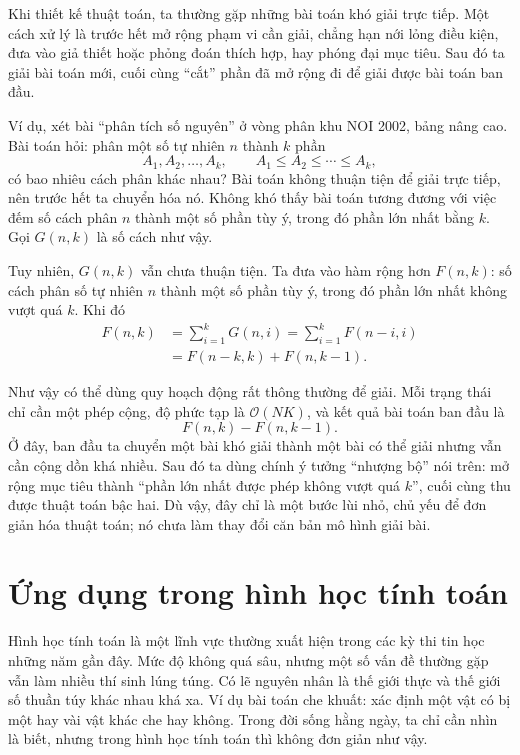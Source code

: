\documentclass[11pt]{article}
\newcommand{\Oh}{\mathcal{O}}
\begin{document}
Khi thiết kế thuật toán, ta thường gặp những bài toán khó giải trực tiếp. Một
cách xử lý là trước hết mở rộng phạm vi cần giải, chẳng hạn nới lỏng điều
kiện, đưa vào giả thiết hoặc phỏng đoán thích hợp, hay phóng đại mục tiêu.
Sau đó ta giải bài toán mới, cuối cùng ``cắt'' phần đã mở rộng đi để giải được
bài toán ban đầu.

Ví dụ, xét bài ``phân tích số nguyên'' ở vòng phân khu NOI 2002, bảng nâng
cao. Bài toán hỏi: phân một số tự nhiên $n$ thành $k$ phần
\[
  A_1,A_2,\ldots,A_k,\qquad A_1\le A_2\le\cdots\le A_k,
\]
có bao nhiêu cách phân khác nhau? Bài toán không thuận tiện để giải trực tiếp,
nên trước hết ta chuyển hóa nó. Không khó thấy bài toán tương đương với việc
đếm số cách phân $n$ thành một số phần tùy ý, trong đó phần lớn nhất bằng
$k$. Gọi $G(n,k)$ là số cách như vậy.

Tuy nhiên, $G(n,k)$ vẫn chưa thuận tiện. Ta đưa vào hàm rộng hơn $F(n,k)$:
số cách phân số tự nhiên $n$ thành một số phần tùy ý, trong đó phần lớn nhất
không vượt quá $k$. Khi đó
\[
\begin{aligned}
  F(n,k)
    &= \sum_{i=1}^{k} G(n,i)
     = \sum_{i=1}^{k} F(n-i,i) \\
    &= F(n-k,k)+F(n,k-1).
\end{aligned}
\]

Như vậy có thể dùng quy hoạch động rất thông thường để giải. Mỗi trạng thái
chỉ cần một phép cộng, độ phức tạp là $\Oh(NK)$, và kết quả bài toán ban đầu
là
\[
  F(n,k)-F(n,k-1).
\]
Ở đây, ban đầu ta chuyển một bài khó giải thành một bài có thể giải nhưng vẫn
cần cộng dồn khá nhiều. Sau đó ta dùng chính ý tưởng ``nhượng bộ'' nói trên:
mở rộng mục tiêu thành ``phần lớn nhất được phép không vượt quá $k$'', cuối
cùng thu được thuật toán bậc hai. Dù vậy, đây chỉ là một bước lùi nhỏ, chủ yếu
để đơn giản hóa thuật toán; nó chưa làm thay đổi căn bản mô hình giải bài.

\section{Ứng dụng trong hình học tính toán}

Hình học tính toán là một lĩnh vực thường xuất hiện trong các kỳ thi tin học
những năm gần đây. Mức độ không quá sâu, nhưng một số vấn đề thường gặp vẫn
làm nhiều thí sinh lúng túng. Có lẽ nguyên nhân là thế giới thực và thế giới
số thuần túy khác nhau khá xa. Ví dụ bài toán che khuất: xác định một vật có
bị một hay vài vật khác che hay không. Trong đời sống hằng ngày, ta chỉ cần
nhìn là biết, nhưng trong hình học tính toán thì không đơn giản như vậy.
\end{document}
